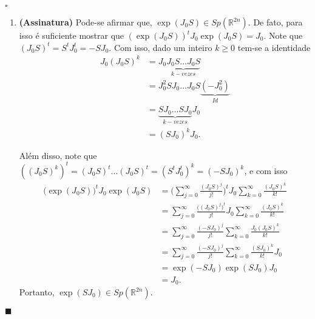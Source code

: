 \documentclass[12pt]{book}
\newenvironment{prova}[1]{$\square$ #1}{\hfill$\blacksquare$}
\newcommand{\estruturacomplexa}{J_{0}}
\newcommand{\gruposimpletico}[1]{Sp(#1)}
\newcommand{\real}[1]{\mathbb{R}^{#1}}
\begin{document}
\begin{prova}
\begin{enumerate}
			\item \textbf{(Assinatura)} Pode-se afirmar que, $\exp(\estruturacomplexa S) \in\gruposimpletico{\real{2n}}$. De fato, para isso é suficiente mostrar que $(\exp(\estruturacomplexa S))^{t}\estruturacomplexa \exp(\estruturacomplexa S)= \estruturacomplexa$. Note que $(\estruturacomplexa S)^{t} 
			= S^{t}\estruturacomplexa^{t} = -S\estruturacomplexa$. Com isso, dado um inteiro $k\geq 0$ tem-se a identidade 
			$$
			\begin{aligned}
			\estruturacomplexa (\estruturacomplexa S)^{k} 
			&= \estruturacomplexa\underbrace{\estruturacomplexa  S\dots \estruturacomplexa S}_{k-vezes} 
			\\
			&= \estruturacomplexa^{2}  S\estruturacomplexa \dots \estruturacomplexa S \underbrace{(-\estruturacomplexa^{2})}_{Id} 
			\\
			&=\underbrace{ S\estruturacomplexa \dots  S \estruturacomplexa }_{k-vezes}\estruturacomplexa 
			\\
			&= (S\estruturacomplexa)^{k}\estruturacomplexa.
			\end{aligned}
			$$
			
			Além disso, note que $((\estruturacomplexa S)^{k})^{t} = (\estruturacomplexa S)^{t}\dots (\estruturacomplexa S)^{t} = (S^{t}\estruturacomplexa^{t} )^{k} = (-S\estruturacomplexa)^{k}$, e com isso
			$$
			\begin{aligned}
			\big(\exp(\estruturacomplexa S)\big)^{t}\estruturacomplexa\exp(\estruturacomplexa S)
			&=\Big(\sum_{j=0}^{\infty}\frac{ (\estruturacomplexa S)^{j}}{j!}\Big)^{t} \estruturacomplexa \sum_{k=0}^{\infty}\frac{(\estruturacomplexa S)^{k}}{k!}
			\\
			&=\sum_{j=0}^{\infty}\frac{\big( (\estruturacomplexa S)^{j}\big)^{t}}{j!}\estruturacomplexa \sum_{k=0}^{\infty}\frac{(\estruturacomplexa S)^{k}}{k!}
			\\
			&=\sum_{j=0}^{\infty}\frac{(-S\estruturacomplexa)^{j}}{j!} \sum_{k=0}^{\infty}\frac{\estruturacomplexa(\estruturacomplexa S)^{k}}{k!}
			\\
			&=\sum_{j=0}^{\infty}\frac{(-S\estruturacomplexa)^{j}}{j!} \sum_{k=0}^{\infty}\frac{(S\estruturacomplexa)^{k}}{k!}\estruturacomplexa
			\\
			&=\exp(-S\estruturacomplexa)\exp(S\estruturacomplexa)\estruturacomplexa
			\\
			&=\estruturacomplexa.
			\end{aligned}
			$$
			Portanto, $\exp(S\estruturacomplexa) \in \gruposimpletico{\real{2n}}$. 
			

\end{enumerate}
\end{prova}
\end{document}

